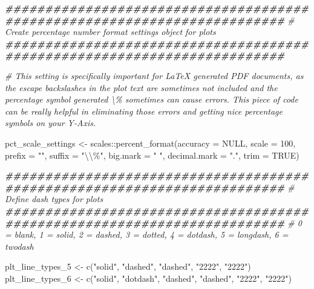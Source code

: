 \documentclass[
]{book}
\newenvironment{Shaded}{\begin{snugshade}}{\end{snugshade}}
\newcommand{\AttributeTok}[1]{\textcolor[rgb]{0.77,0.63,0.00}{#1}}
\newcommand{\CommentTok}[1]{\textcolor[rgb]{0.56,0.35,0.01}{\textit{#1}}}
\newcommand{\ConstantTok}[1]{\textcolor[rgb]{0.00,0.00,0.00}{#1}}
\newcommand{\DecValTok}[1]{\textcolor[rgb]{0.00,0.00,0.81}{#1}}
\newcommand{\DocumentationTok}[1]{\textcolor[rgb]{0.56,0.35,0.01}{\textbf{\textit{#1}}}}
\newcommand{\FunctionTok}[1]{\textcolor[rgb]{0.00,0.00,0.00}{#1}}
\newcommand{\NormalTok}[1]{#1}
\newcommand{\OtherTok}[1]{\textcolor[rgb]{0.56,0.35,0.01}{#1}}
\newcommand{\SpecialCharTok}[1]{\textcolor[rgb]{0.00,0.00,0.00}{#1}}
\newcommand{\StringTok}[1]{\textcolor[rgb]{0.31,0.60,0.02}{#1}}
\begin{document}
\begin{Shaded}
\begin{Highlighting}[]
\DocumentationTok{\#\#\#\#\#\#\#\#\#\#\#\#\#\#\#\#\#\#\#\#\#\#\#\#\#\#\#\#\#\#\#\#\#\#\#\#\#\#\#\#\#\#\#\#\#\#\#\#\#\#\#\#\#\#\#\#\#\#\#\#\#\#\#\#\#\#\#\#\#\#\#\#\#}
\CommentTok{\# Create percentage number format settings object for plots}
\DocumentationTok{\#\#\#\#\#\#\#\#\#\#\#\#\#\#\#\#\#\#\#\#\#\#\#\#\#\#\#\#\#\#\#\#\#\#\#\#\#\#\#\#\#\#\#\#\#\#\#\#\#\#\#\#\#\#\#\#\#\#\#\#\#\#\#\#\#\#\#\#\#\#\#\#\#}

\CommentTok{\# This setting is specifically important for LaTeX generated PDF documents, as the escape backslashes in the plot text are sometimes not included and the percentage symbol generated \textbackslash{}\% sometimes can cause errors. This piece of code can be really helpful in eliminating those errors and getting nice percentage symbols on your Y{-}Axis.}

\NormalTok{pct\_scale\_settings }\OtherTok{\textless{}{-}}\NormalTok{ scales}\SpecialCharTok{::}\FunctionTok{percent\_format}\NormalTok{(}\AttributeTok{accuracy =} \ConstantTok{NULL}\NormalTok{,}
                                             \AttributeTok{scale =} \DecValTok{100}\NormalTok{, }
                                             \AttributeTok{prefix =} \StringTok{""}\NormalTok{, }
                                             \AttributeTok{suffix =} \StringTok{"}\SpecialCharTok{\textbackslash{}\textbackslash{}}\StringTok{\%"}\NormalTok{,}
                                             \AttributeTok{big.mark =} \StringTok{" "}\NormalTok{, }
                                             \AttributeTok{decimal.mark =} \StringTok{"."}\NormalTok{, }
                                             \AttributeTok{trim =} \ConstantTok{TRUE}\NormalTok{)}


\DocumentationTok{\#\#\#\#\#\#\#\#\#\#\#\#\#\#\#\#\#\#\#\#\#\#\#\#\#\#\#\#\#\#\#\#\#\#\#\#\#\#\#\#\#\#\#\#\#\#\#\#\#\#\#\#\#\#\#\#\#\#\#\#\#\#\#\#\#\#\#\#\#\#\#\#\#}
\CommentTok{\# Define dash types for plots}
\DocumentationTok{\#\#\#\#\#\#\#\#\#\#\#\#\#\#\#\#\#\#\#\#\#\#\#\#\#\#\#\#\#\#\#\#\#\#\#\#\#\#\#\#\#\#\#\#\#\#\#\#\#\#\#\#\#\#\#\#\#\#\#\#\#\#\#\#\#\#\#\#\#\#\#\#\#}
\CommentTok{\#  0 = blank, 1 = solid, 2 = dashed, 3 = dotted, 4 = dotdash, 5 = longdash, 6 = twodash}

\NormalTok{plt\_line\_types\_5 }\OtherTok{\textless{}{-}} \FunctionTok{c}\NormalTok{(}\StringTok{"solid"}\NormalTok{, }\StringTok{"dashed"}\NormalTok{, }\StringTok{"dashed"}\NormalTok{, }\StringTok{"2222"}\NormalTok{, }\StringTok{"2222"}\NormalTok{)}
\NormalTok{plt\_line\_types\_6 }\OtherTok{\textless{}{-}} \FunctionTok{c}\NormalTok{(}\StringTok{"solid"}\NormalTok{, }\StringTok{"dotdash"}\NormalTok{, }\StringTok{"dashed"}\NormalTok{, }\StringTok{"dashed"}\NormalTok{, }\StringTok{"2222"}\NormalTok{, }\StringTok{"2222"}\NormalTok{)}


\end{Highlighting}
\end{Shaded}
\end{document}
